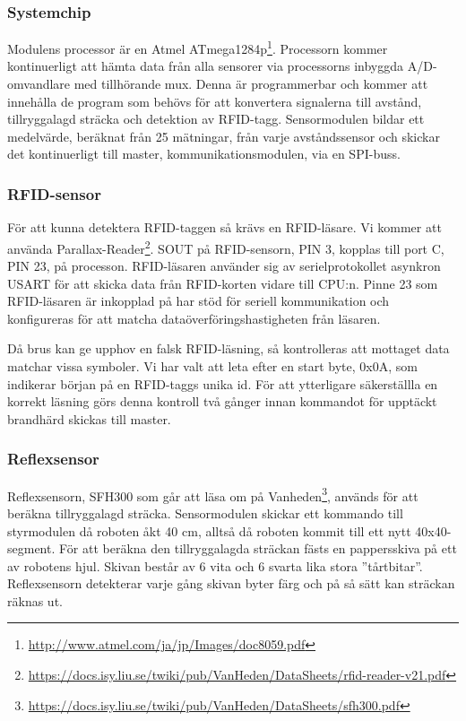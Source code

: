 \documentclass[a4paper,12pt,fleqn]{article}
\begin{document}
\subsubsection{Systemchip}
Modulens processor är en Atmel ATmega1284p\footnote{\url{http://www.atmel.com/ja/jp/Images/doc8059.pdf}}. Processorn kommer kontinuerligt att hämta data från alla sensorer via processorns inbyggda A/D-omvandlare med tillhörande mux. Denna är programmerbar och kommer att innehålla de program som behövs för att konvertera signalerna till avstånd, tillryggalagd sträcka och detektion av RFID-tagg. Sensormodulen bildar ett medelvärde, beräknat från 25 mätningar, från varje avståndssensor och skickar det kontinuerligt till master, 
kommunikationsmodulen, via en SPI-buss.

\subsubsection{RFID-sensor}
För att kunna detektera RFID-taggen så krävs en RFID-läsare. Vi kommer att använda Par\-all\-ax-Read\-er\footnote{\url{https://docs.isy.liu.se/twiki/pub/VanHeden/DataSheets/rfid-reader-v21.pdf}}. 
SOUT på RFID-sensorn, PIN 3, kopplas till port C, PIN 23, på processon. RFID-läsaren använder sig av serielprotokollet asynkron USART för att skicka data från RFID-korten vidare till CPU:n. Pinne 23 som RFID-läsaren är inkopplad på har stöd för seriell kommunikation och konfigureras för att matcha dataöverföringshastigheten från läsaren.

Då brus kan ge upphov en falsk RFID-läsning, så kontrolleras att mottaget data matchar vissa symboler. Vi har valt att leta efter en start byte, 0x0A, som indikerar början på en RFID-taggs unika id. För att ytterligare säkerställla en korrekt läsning görs denna kontroll två gånger innan kommandot för upptäckt brandhärd skickas till master.

\subsubsection{Reflexsensor}
Reflexsensorn, SFH300 som går att läsa om på Vanheden\footnote{\url{https://docs.isy.liu.se/twiki/pub/VanHeden/DataSheets/sfh300.pdf}}, används för att beräkna tillryggalagd sträcka. Sensormodulen skickar ett kommando till styrmodulen då roboten åkt 40 cm, alltså då roboten kommit till ett nytt 40x40-segment. För att beräkna den tillryggalagda sträckan fästs en pappersskiva på ett av robotens hjul. Skivan består av 6 vita och 6 svarta lika stora ''tårtbitar''. Reflexsensorn detekterar varje gång skivan byter färg och på så sätt kan sträckan räknas ut.
\end{document}
